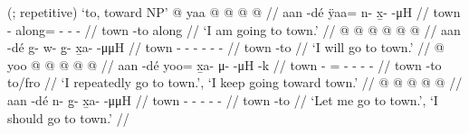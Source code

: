 \documentclass[12pt,letterpaper,oneside,article]{memoir}
\begin{document}
\pex\label{ex:motderiv-overlap-de-n}%
\a\label{ex:motderiv-overlap-de-n-motderiv}%
%
	 (;  repetitive) ‘to, toward NP’
\a\label{ex:motderiv-overlap-de-n-prog}%
%
\begingl
	\gla	{} @ {} yaa @  @ {} @ {} @ {} //
	\glb	aan -dé ÿaa= n- x̱-  -μH //
	\glc	town - along= - -  - //
	\gld	town -to along\•  {} {} {} //
	\glft	‘I am going to town.’
		//
\endgl
\a\label{ex:motderiv-overlap-de-n-prosp}%
%
\begingl
	\gla	{} @ {}  @ {} @ {} @ {} @ {} @ {} //
	\glb	aan -dé g- w- g̱- x̱a-  -μμH //
	\glc	town - - - - -  - //
	\gld	town -to  {} {} {} {} {} //
	\glft	‘I will go to town.’
		//
\endgl
\a\label{ex:motderiv-overlap-de-n-repimpfv}%
%
\begingl
	\gla	{} @ {} yoo @  @ {} @ {} @ {} @ {} //
	\glb	aan -dé yoo= x̱a- μ-  -μH -k //
	\glc	town - = - -  - - //
	\gld	town -to to/fro\·  {} {} {} {} //
	\glft	‘I repeatedly go to town.’, ‘I keep going toward town.’
		//
\endgl
\a\label{ex:motderiv-overlap-de-n-hort}%
%
\begingl
	\gla	{} @ {}  @ {} @ {} @ {} @ {} //
	\glb	aan -dé n- g̱- x̱a-  -μμH //
	\glc	town - - - -  - //
	\gld	town -to  {} {} {} {} //
	\glft	‘Let me go to town.’, ‘I should go to town.’
		//
\endgl
\xe
\end{document}

